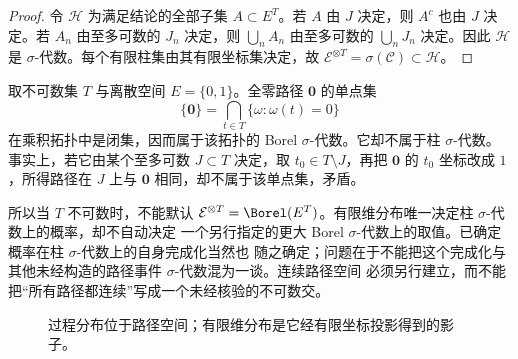 \begin{proof}
令 $\mathcal H$ 为满足结论的全部子集 $A\subset E^T$。若 $A$ 由 $J$ 决定，则 $A^c$ 也由 $J$
决定。若 $A_n$ 由至多可数的 $J_n$ 决定，则 $\bigcup_nA_n$ 由至多可数的
$\bigcup_nJ_n$ 决定。因此 $\mathcal H$ 是 $\sigma$-代数。每个有限柱集由其有限坐标集决定，故
$\mathcal E^{\otimes T}=\sigma(\mathcal C)\subset\mathcal H$。
\end{proof}

\begin{remark}\label{remark:6-1-1-countable-coordinates}
取不可数集 $T$ 与离散空间 $E=\{0,1\}$。全零路径 $\mathbf0$ 的单点集
\[
 \{\mathbf0\}=\bigcap_{t\in T}\{\omega:\omega(t)=0\}
\]
在乘积拓扑中是闭集，因而属于该拓扑的 Borel $\sigma$-代数。它却不属于柱
$\sigma$-代数。事实上，若它由某个至多可数 $J\subset T$ 决定，取 $t_0\in T\setminus J$，再把
$\mathbf0$ 的 $t_0$ 坐标改成 $1$，所得路径在 $J$ 上与 $\mathbf0$ 相同，却不属于该单点集，矛盾。

所以当 $T$ 不可数时，不能默认
$\mathcal E^{\otimes T}=\Borel(E^T)$。有限维分布唯一决定柱 $\sigma$-代数上的概率，却不自动决定
一个另行指定的更大 Borel $\sigma$-代数上的取值。已确定概率在柱 $\sigma$-代数上的自身完成化当然也
随之确定；问题在于不能把这个完成化与其他未经构造的路径事件 $\sigma$-代数混为一谈。连续路径空间
必须另行建立，而不能把“所有路径都连续”写成一个未经核验的不可数交。
\end{remark}

\begin{figure}[htbp]
\centering
{}
\caption{过程分布位于路径空间；有限维分布是它经有限坐标投影得到的影子。}
\label{fig:6-1-1-law-and-fdd}
\end{figure}

